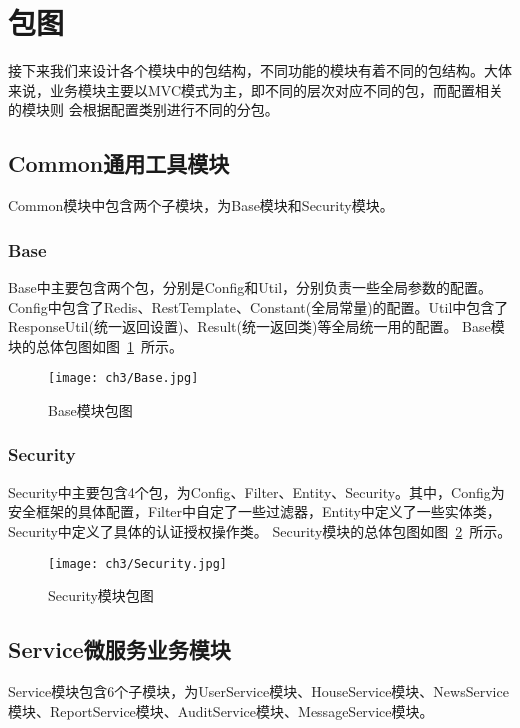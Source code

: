 \section{包图}
接下来我们来设计各个模块中的包结构，不同功能的模块有着不同的包结构。大体来说，业务模块主要以MVC模式为主，即不同的层次对应不同的包，而配置相关的模块则
会根据配置类别进行不同的分包。

\subsection{Common通用工具模块}
Common模块中包含两个子模块，为Base模块和Security模块。
\subsubsection{Base}
Base中主要包含两个包，分别是Config和Util，分别负责一些全局参数的配置。Config中包含了Redis、RestTemplate、Constant(全局常量)的配置。Util中包含了ResponseUtil(统一返回设置)、Result(统一返回类)等全局统一用的配置。
Base模块的总体包图如图~\ref{fig:Base}~所示。
\begin{figure}[htbp]
    \centering
    \texttt{[image: ch3/Base.jpg]}
    \caption{Base模块包图}\label{fig:Base}
    \vspace{\baselineskip} %
\end{figure}

\subsubsection{Security}
Security中主要包含4个包，为Config、Filter、Entity、Security。其中，Config为安全框架的具体配置，Filter中自定了一些过滤器，Entity中定义了一些实体类，Security中定义了具体的认证授权操作类。
Security模块的总体包图如图~\ref{fig:Security}~所示。
\begin{figure}[htbp]
    \centering
    \texttt{[image: ch3/Security.jpg]}
    \caption{Security模块包图}\label{fig:Security}
    \vspace{\baselineskip} %
\end{figure}

\subsection{Service微服务业务模块}
Service模块包含6个子模块，为UserService模块、HouseService模块、NewsService模块、ReportService模块、AuditService模块、MessageService模块。

